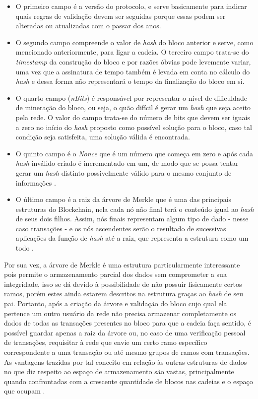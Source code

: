 \begin{itemize}
    \item O primeiro campo é a versão do protocolo, e serve basicamente para indicar quais regras de validação devem ser seguidas porque essas podem ser alteradas ou atualizadas com o passar dos anos.
    \item O segundo campo compreende o valor de \textit{hash} do bloco anterior e serve, como mencionado anteriormente, para ligar a cadeia. O terceiro campo trata-se do \textit{timestamp} da construção do bloco e por razões óbvias pode levemente variar, uma vez que a assinatura de tempo também é levada em conta no cálculo do \textit{hash} e dessa forma não representará o tempo da finalização do bloco em si.
    \item O quarto campo (\textit{nBits}) é responsável por representar o nível de dificuldade de mineração do bloco, ou seja, o quão difícil é gerar um \textit{hash} que seja aceito pela rede. O valor do campo trata-se do número de bits que devem ser iguais a zero no início do \textit{hash} proposto como possível solução para o bloco, caso tal condição seja satisfeita, uma solução válida é encontrada.
    \item O quinto campo é o \textit{Nonce} que é um número que começa em zero e após cada \textit{hash} inválido criado é incrementado em um, de modo que se possa tentar gerar um \textit{hash} distinto possivelmente válido para o mesmo conjunto de informações \cite{blockchain:mastering_bitcoin}.
    \item O último campo é a raiz da árvore de Merkle que é uma das principais estruturas do Blockchain, nela cada nó não final terá o conteúdo igual ao \textit{hash} de seus dois filhos. Assim, nós finais representam algum tipo de dado - nesse caso transações - e os nós ascendentes serão o resultado de sucessivas aplicações da função de \textit{hash} até a raiz, que representa a estrutura como um todo \cite{blockchain:capitulo5}.
\end{itemize}
%
Por sua vez, a árvore de Merkle é uma estrutura particularmente interessante pois permite o armazenamento parcial dos dados sem comprometer a sua integridade, isso se dá devido à possibilidade de não possuir fisicamente certos ramos, porém estes ainda estarem descritos na estrutura graças ao \textit{hash} de seu pai. Portanto, após a criação da árvore e validação do bloco cujo qual ela pertence um outro usuário da rede não precisa armazenar completamente os dados de todas as transações presentes no bloco para que a cadeia faça sentido, é possível guardar apenas a raiz da árvore ou, no caso de uma verificação pessoal de transações, requisitar à rede que envie um certo ramo específico correspondente a uma transação ou até mesmo grupos de ramos com transações. As vantagens trazidas por tal conceito em relação às outras estruturas de dados no que diz respeito ao espaço de armazenamento são vastas, principalmente quando confrontadas com a crescente quantidade de blocos nas cadeias e o espaço que ocupam \cite{blockchain:seguranca_desafios, blockchain:bitcoin_whitepaper}.

